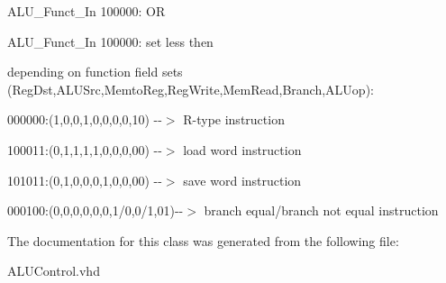 \-A\-L\-U\-\_\-\-Funct\-\_\-\-In 100000\-: \-O\-R

\-A\-L\-U\-\_\-\-Funct\-\_\-\-In 100000\-: set less then

depending on function field sets (\-Reg\-Dst,\-A\-L\-U\-Src,\-Memto\-Reg,\-Reg\-Write,\-Mem\-Read,\-Branch,\-A\-L\-Uop)\-:

000000\-:(1,0,0,1,0,0,0,0,10) -\/-\/$>$ \-R-\/type instruction

100011\-:(0,1,1,1,1,0,0,0,00) -\/-\/$>$ load word instruction

101011\-:(0,1,0,0,0,1,0,0,00) -\/-\/$>$ save word instruction

000100\-:(0,0,0,0,0,0,1/0,0/1,01)-\/-\/$>$ branch equal/branch not equal instruction 

\-The documentation for this class was generated from the following file\-:\begin{DoxyCompactItemize}
\item 
\-A\-L\-U\-Control.\-vhd\end{DoxyCompactItemize}
